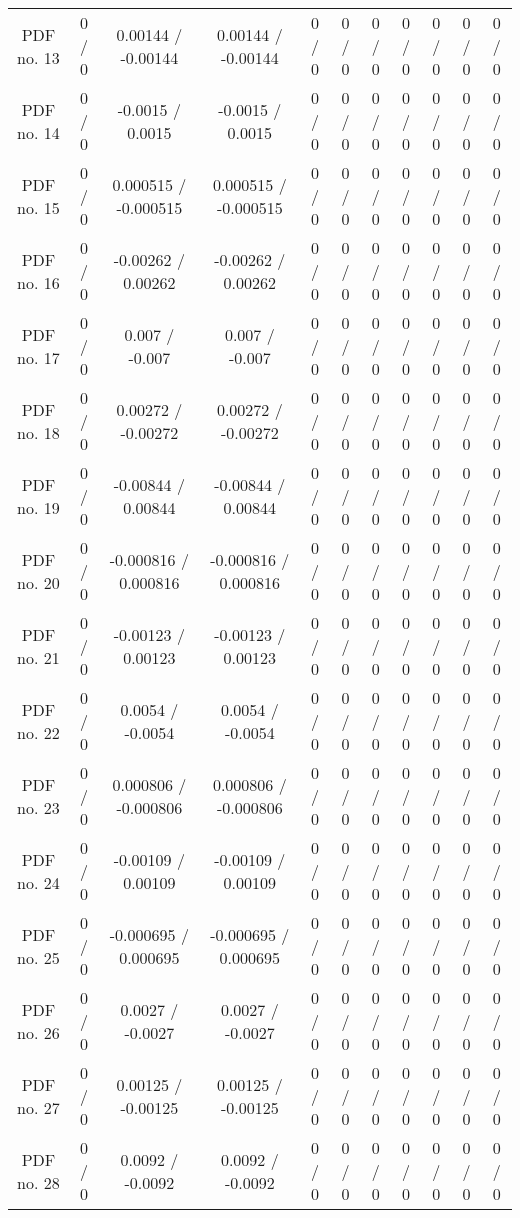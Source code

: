 {\begin{landscape}
\begin{longtable}{@{\extracolsep{\fill}}| *{11}{c|}}
  PDF no. 13 & 0 / 0 & 0.00144 / -0.00144 & 0.00144 / -0.00144 & 0 / 0 & 0 / 0 & 0 / 0 & 0 / 0 & 0 / 0 & 0 / 0 & 0 / 0 \\ 
  PDF no. 14 & 0 / 0 & -0.0015 / 0.0015 & -0.0015 / 0.0015 & 0 / 0 & 0 / 0 & 0 / 0 & 0 / 0 & 0 / 0 & 0 / 0 & 0 / 0 \\ 
  PDF no. 15 & 0 / 0 & 0.000515 / -0.000515 & 0.000515 / -0.000515 & 0 / 0 & 0 / 0 & 0 / 0 & 0 / 0 & 0 / 0 & 0 / 0 & 0 / 0 \\ 
  PDF no. 16 & 0 / 0 & -0.00262 / 0.00262 & -0.00262 / 0.00262 & 0 / 0 & 0 / 0 & 0 / 0 & 0 / 0 & 0 / 0 & 0 / 0 & 0 / 0 \\ 
  PDF no. 17 & 0 / 0 & 0.007 / -0.007 & 0.007 / -0.007 & 0 / 0 & 0 / 0 & 0 / 0 & 0 / 0 & 0 / 0 & 0 / 0 & 0 / 0 \\ 
  PDF no. 18 & 0 / 0 & 0.00272 / -0.00272 & 0.00272 / -0.00272 & 0 / 0 & 0 / 0 & 0 / 0 & 0 / 0 & 0 / 0 & 0 / 0 & 0 / 0 \\ 
  PDF no. 19 & 0 / 0 & -0.00844 / 0.00844 & -0.00844 / 0.00844 & 0 / 0 & 0 / 0 & 0 / 0 & 0 / 0 & 0 / 0 & 0 / 0 & 0 / 0 \\ 
  PDF no. 20 & 0 / 0 & -0.000816 / 0.000816 & -0.000816 / 0.000816 & 0 / 0 & 0 / 0 & 0 / 0 & 0 / 0 & 0 / 0 & 0 / 0 & 0 / 0 \\ 
  PDF no. 21 & 0 / 0 & -0.00123 / 0.00123 & -0.00123 / 0.00123 & 0 / 0 & 0 / 0 & 0 / 0 & 0 / 0 & 0 / 0 & 0 / 0 & 0 / 0 \\ 
  PDF no. 22 & 0 / 0 & 0.0054 / -0.0054 & 0.0054 / -0.0054 & 0 / 0 & 0 / 0 & 0 / 0 & 0 / 0 & 0 / 0 & 0 / 0 & 0 / 0 \\ 
  PDF no. 23 & 0 / 0 & 0.000806 / -0.000806 & 0.000806 / -0.000806 & 0 / 0 & 0 / 0 & 0 / 0 & 0 / 0 & 0 / 0 & 0 / 0 & 0 / 0 \\ 
  PDF no. 24 & 0 / 0 & -0.00109 / 0.00109 & -0.00109 / 0.00109 & 0 / 0 & 0 / 0 & 0 / 0 & 0 / 0 & 0 / 0 & 0 / 0 & 0 / 0 \\ 
  PDF no. 25 & 0 / 0 & -0.000695 / 0.000695 & -0.000695 / 0.000695 & 0 / 0 & 0 / 0 & 0 / 0 & 0 / 0 & 0 / 0 & 0 / 0 & 0 / 0 \\ 
  PDF no. 26 & 0 / 0 & 0.0027 / -0.0027 & 0.0027 / -0.0027 & 0 / 0 & 0 / 0 & 0 / 0 & 0 / 0 & 0 / 0 & 0 / 0 & 0 / 0 \\ 
  PDF no. 27 & 0 / 0 & 0.00125 / -0.00125 & 0.00125 / -0.00125 & 0 / 0 & 0 / 0 & 0 / 0 & 0 / 0 & 0 / 0 & 0 / 0 & 0 / 0 \\ 
  PDF no. 28 & 0 / 0 & 0.0092 / -0.0092 & 0.0092 / -0.0092 & 0 / 0 & 0 / 0 & 0 / 0 & 0 / 0 & 0 / 0 & 0 / 0 & 0 / 0 \\ 

\end{longtable}
\end{landscape}}
